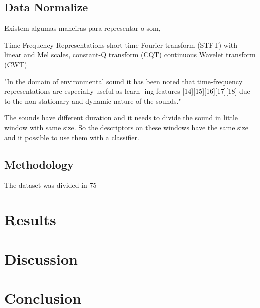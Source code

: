 \documentclass[12pt,oneside,a4paper]{article}
\begin{document}
\subsection{Data Normalize}

Existem algumas maneiras para representar o som,

Time-Frequency Representations
	short-time Fourier transform (STFT) with linear and Mel scales,
	constant-Q transform (CQT)
	continuous Wavelet transform (CWT)

"In the domain of environmental sound it has been noted that
time-frequency representations are especially useful as learn-
ing features [14][15][16][17][18] due to the non-stationary
and dynamic nature of the sounds." \cite{huzaifah-features}


The sounds have different duration and it needs to divide the sound in little window
with same size. So the descriptors on these windows have the same size and it possible
to use them with a classifier.


\subsection{Methodology}


The dataset was divided in 75%



\section{Results}


\section{Discussion}


\section{Conclusion}




\end{document}
